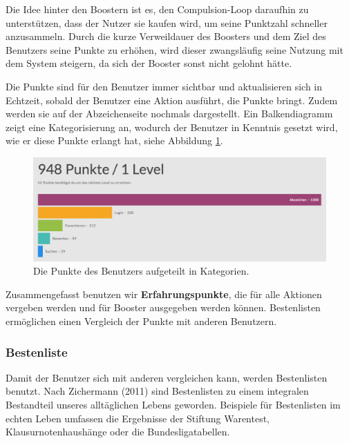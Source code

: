 \documentclass[12pt,twoside]{book}
\begin{document}
Die Idee hinter den Boostern ist es, den Compulsion-Loop daraufhin zu unterstützen, dass der Nutzer sie kaufen wird, um seine Punktzahl schneller anzusammeln. Durch die kurze Verweildauer des Boosters und dem Ziel des Benutzers seine Punkte zu erhöhen, wird dieser zwangsläufig seine Nutzung mit dem System steigern, da sich der Booster sonst nicht gelohnt hätte.

Die Punkte sind für den Benutzer immer sichtbar und aktualisieren sich in Echtzeit, sobald der Benutzer eine Aktion ausführt, die Punkte bringt. Zudem werden sie auf der Abzeichenseite nochmals dargestellt. Ein Balkendiagramm zeigt eine Kategorisierung an, wodurch der Benutzer in Kenntnis gesetzt wird, wie er diese Punkte erlangt hat, siehe Abbildung \ref{fig:points}.

\begin{figure}[htbp]
    \centering
    \includegraphics[width=1.0\textwidth]{images/infoboard_userstats.png}
    \caption{Die Punkte des Benutzers aufgeteilt in Kategorien.}
    \label{fig:points}
\end{figure}

Zusammengefasst benutzen wir \textbf{Erfahrungspunkte}, die für alle Aktionen vergeben werden und für Booster ausgegeben werden können. Bestenlisten ermöglichen einen Vergleich der Punkte mit anderen Benutzern.

\subsubsection*{Bestenliste}

Damit der Benutzer sich mit anderen vergleichen kann, werden Bestenlisten benutzt. Nach Zichermann (2011) \citep[pp. 49 - 50]{zichermann2011gamification} sind Bestenlisten zu einem integralen Bestandteil unseres alltäglichen Lebens geworden. Beispiele für Bestenlisten im echten Leben umfassen die Ergebnisse der Stiftung Warentest, Klausurnotenhaushänge oder die Bundesligatabellen.
\end{document}
